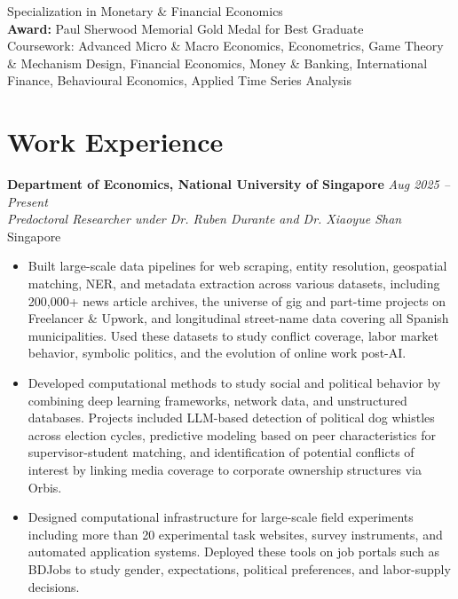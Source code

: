 \documentclass[10pt,a4paper]{article}
\newcommand{\cventry}[4]{%
\textbf{#1} \hfill \textit{#2} \\
\textit{#3} \hfill #4
\vspace{2pt}
}
\begin{document}
Specialization in Monetary \& Financial Economics\\
\textbf{Award:} Paul Sherwood Memorial Gold Medal for Best Graduate\\
Coursework: Advanced Micro \& Macro Economics, Econometrics, Game Theory \& Mechanism Design, Financial Economics, Money \& Banking, International Finance, Behavioural Economics, Applied Time Series Analysis

\section{Work Experience}

\cventry{Department of Economics, National University of Singapore}{Aug 2025 -- Present}{Predoctoral Researcher under Dr. Ruben Durante and Dr. Xiaoyue Shan}{Singapore}
\begin{itemize}
\item Built large-scale data pipelines for web scraping, entity resolution, geospatial matching, NER, and metadata extraction across various datasets, including 200,000+ news article archives, the universe of gig and part-time projects on Freelancer \& Upwork, and longitudinal street-name data covering all Spanish municipalities. Used these datasets to study conflict coverage, labor market behavior, symbolic politics, and the evolution of online work post-AI.
\item Developed computational methods to study social and political behavior by combining deep learning frameworks, network data, and unstructured databases. Projects included LLM-based detection of political dog whistles across election cycles, predictive modeling based on peer characteristics for supervisor-student matching, and identification of potential conflicts of interest by linking media coverage to corporate ownership structures via Orbis.
\item Designed computational infrastructure for large-scale field experiments including more than 20 experimental task websites, survey instruments, and automated application systems. Deployed these tools on job portals such as BDJobs to study gender, expectations, political preferences, and labor-supply decisions.
\end{itemize}


\vspace{4pt}
\end{document}
